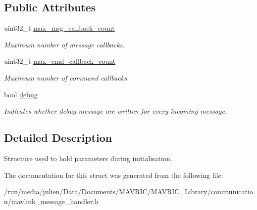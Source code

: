 \subsection*{Public Attributes}
\begin{DoxyCompactItemize}
\item 
\hypertarget{structmavlink__message__handler__conf__t_a6dcd938a0085f7b1fb7d086ecd4a333b}{uint32\+\_\+t \hyperlink{structmavlink__message__handler__conf__t_a6dcd938a0085f7b1fb7d086ecd4a333b}{max\+\_\+msg\+\_\+callback\+\_\+count}}\label{structmavlink__message__handler__conf__t_a6dcd938a0085f7b1fb7d086ecd4a333b}

\begin{DoxyCompactList}\small\item\em Maximum number of message callbacks. \end{DoxyCompactList}\item 
\hypertarget{structmavlink__message__handler__conf__t_ab5cfa82b2d17ed8af3378dde53acf1a4}{uint32\+\_\+t \hyperlink{structmavlink__message__handler__conf__t_ab5cfa82b2d17ed8af3378dde53acf1a4}{max\+\_\+cmd\+\_\+callback\+\_\+count}}\label{structmavlink__message__handler__conf__t_ab5cfa82b2d17ed8af3378dde53acf1a4}

\begin{DoxyCompactList}\small\item\em Maximum number of command callbacks. \end{DoxyCompactList}\item 
\hypertarget{structmavlink__message__handler__conf__t_a9423f9bf673ca6d0246518f343fa74b6}{bool \hyperlink{structmavlink__message__handler__conf__t_a9423f9bf673ca6d0246518f343fa74b6}{debug}}\label{structmavlink__message__handler__conf__t_a9423f9bf673ca6d0246518f343fa74b6}

\begin{DoxyCompactList}\small\item\em Indicates whether debug message are written for every incoming message. \end{DoxyCompactList}\end{DoxyCompactItemize}


\subsection{Detailed Description}
Structure used to hold parameters during initialisation. 

The documentation for this struct was generated from the following file\+:\begin{DoxyCompactItemize}
\item 
/run/media/julien/\+Data/\+Documents/\+M\+A\+V\+R\+I\+C/\+M\+A\+V\+R\+I\+C\+\_\+\+Library/communication/mavlink\+\_\+message\+\_\+handler.\+h\end{DoxyCompactItemize}
